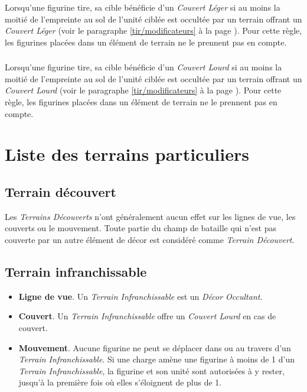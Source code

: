 Lorsqu'une figurine tire, sa cible bénéficie d'un \emph{Couvert Léger} si au moins la moitié de l'empreinte au sol de l'unité ciblée est occultée par un terrain offrant un \emph{Couvert Léger} (voir le paragraphe \ref{tir/modificateurs} à la page \pageref{tir/modificateurs}). Pour cette règle, les figurines placées dans un élément de terrain ne le prennent pas en compte.

\subsubsection*{}

Lorsqu'une figurine tire, sa cible bénéficie d'un \emph{Couvert Lourd} si au moins la moitié de l'empreinte au sol de l'unité ciblée est occultée par un terrain offrant un \emph{Couvert Lourd} (voir le paragraphe \ref{tir/modificateurs} à la page \pageref{tir/modificateurs}). Pour cette règle, les figurines placées dans un élément de terrain ne le prennent pas en compte.

\section{Liste des terrains particuliers}

\subsection{Terrain découvert}

Les \emph{Terrains Découverts} n'ont généralement aucun effet sur les lignes de vue, les couverts ou le mouvement. Toute partie du champ de bataille qui n'est pas couverte par un autre élément de décor est considéré comme \emph{Terrain Découvert}.

\subsection{Terrain infranchissable}

\begin{itemize}[label={-}]
\item \textbf{Ligne de vue}. Un \emph{Terrain Infranchissable} est un \emph{Décor Occultant}.
\item \textbf{Couvert}. Un \emph{Terrain Infranchissable} offre un \emph{Couvert Lourd} en cas de couvert.
\item \textbf{Mouvement}. Aucune figurine ne peut se déplacer dans ou au travers d'un \emph{Terrain Infranchissable}. Si une charge amène une figurine à moins de \unit{1}{\pouce} d'un \emph{Terrain Infranchissable}, la figurine et son unité sont autorisées à y rester, jusqu'à la première fois où elles s'éloignent de plus de \unit{1}{\pouce}.
\end{itemize}

